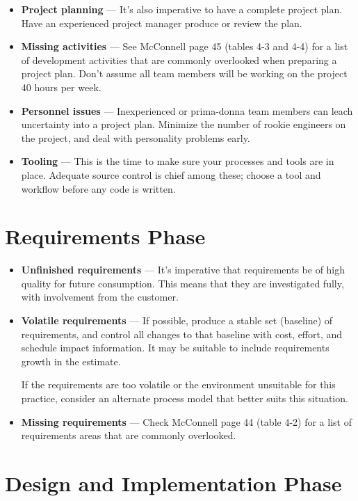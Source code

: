 \documentclass[11pt]{article}
\begin{document}
\begin{itemize}
\item {\bf Project planning} --- It's also imperative to have a complete project plan.  Have an
  experienced project manager produce or review the plan.
\item {\bf Missing activities} --- See McConnell page 45 (tables 4-3 and 4-4) for a list of
  development activities that are commonly overlooked when preparing a project plan.  Don't assume
  all team members will be working on the project 40 hours per week.
\item {\bf Personnel issues} --- Inexperienced or prima-donna team members can leach uncertainty into
  a project plan.  Minimize the number of rookie engineers on the project, and deal with personality
  problems early.
\item {\bf Tooling} --- This is the time to make sure your processes and tools are in place.
  Adequate source control is chief among these; choose a tool and workflow before any code is
  written.
\end{itemize}


\section{Requirements Phase}

\begin{itemize}
\item {\bf Unfinished requirements} --- It's imperative that requirements be of high quality for
  future consumption.  This means that they are investigated fully, with involvement from the
  customer.
\item {\bf Volatile requirements} --- If possible, produce a stable set (baseline) of requirements,
  and control all changes to that baseline with cost, effort, and schedule impact information.  It
  may be suitable to include requirements growth in the estimate.

  If the requirements are too volatile or the environment unsuitable for this practice, consider an
  alternate process model that better suits this situation.
\item {\bf Missing requirements} --- Check McConnell page 44 (table 4-2) for a list of requirements
  areas that are commonly overlooked.
  \end{itemize}


\section{Design and Implementation Phase}
\end{document}
